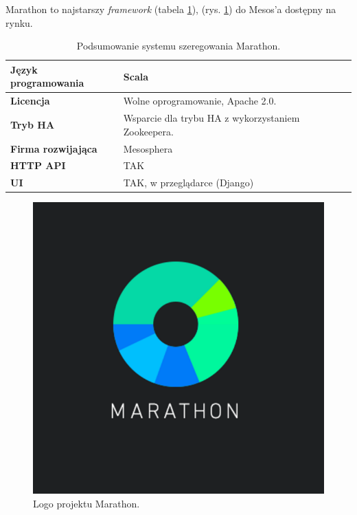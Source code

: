 \documentclass[10pt,a4paper,titlepage,twoside]{report}
\begin{document}
Marathon to najstarszy \textit{framework} (tabela \ref{marathon_info}), (rys. \ref{marathon_logo}) do Mesos'a dostępny na rynku. 
\begin{table}[!h]
\caption{Podsumowanie systemu szeregowania Marathon.}
\label{marathon_info}
\centering
\begin{tabular}{|p{4cm}|p{6cm}|}
  \hline
  \textbf{Język programowania} & Scala \\
  \hline
  \textbf{Licencja} & Wolne oprogramowanie, Apache 2.0. \\
  \hline
  \textbf{Tryb HA} & Wsparcie dla trybu HA z wykorzystaniem Zookeepera. \\
  \hline
  \textbf{Firma rozwijająca} & Mesosphera \\
  \hline
  \textbf{HTTP API} & TAK \\
  \hline
  \textbf{UI} & TAK, w przeglądarce (Django) \\
  \hline
\end{tabular}
\end{table}

\begin{figure}[!h]
	\centering
	\includegraphics[scale=0.5]{pics/marathon_logo.png}
	\caption{Logo projektu Marathon.}
	\label{marathon_logo}
\end{figure}
\end{document}
